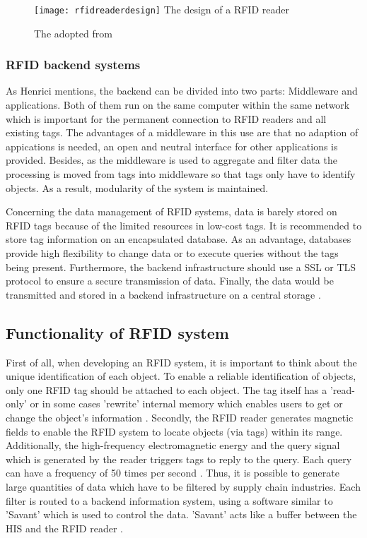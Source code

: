 \begin{figure}
\centering
\texttt{[image: rfidreaderdesign]} The design of a RFID reader 
\caption{\label{fig:readerdesign}The adopted from \cite[p.17]{chipless}} 
\end{figure}

\subsubsection{RFID backend systems} \label{backend}

As Henrici \cite{henrici} mentions, the backend can be divided into two parts: Middleware and applications. Both of them run on the same computer within the same network which is important for the permanent connection to RFID readers and all existing tags. The advantages of a middleware in this use are that no adaption of appications is needed, an open and neutral interface for other applications is provided. Besides, as the middleware is used to aggregate and filter data the processing is moved from tags into middleware so that tags only have to identify objects. As a result, modularity of the system is maintained.

Concerning the data management of RFID systems, data is barely stored on RFID tags because of the limited resources in low-cost tags. It is recommended \cite{henrici} to store tag information on an encapsulated database. As an advantage, databases provide high flexibility to change data or to execute queries without the tags being present. Furthermore, the backend infrastructure should use a \ac{SSL} or \ac{TLS} protocol to ensure a secure transmission of data. Finally, the data would be transmitted and stored in a backend infrastructure on a central storage \cite{henrici}.

\subsection{Functionality of RFID system} \label{chipless}

First of all, when developing an RFID system, it is important to think about the unique identification of each object. To enable a reliable identification of objects, only one RFID tag should be attached to each object. The tag itself has a 'read-only' or in some cases 'rewrite' internal memory which enables users to get or change the object's information \cite{ncbi}. 
Secondly, the RFID reader generates magnetic fields to enable the RFID system to locate objects (via tags) within its range. Additionally, the high-frequency electromagnetic energy and the query signal which is generated by the reader triggers tags to reply to the query. Each query can have a frequency of 50 times per second \cite{ncbi}. Thus, it is possible to generate large quantities of data which have to be filtered by supply chain industries. Each filter is routed to a backend information system, using a software similar to 'Savant' which is used to control the data. 'Savant' acts like a buffer between the \ac{HIS} and the RFID reader \cite{ncbi}.

